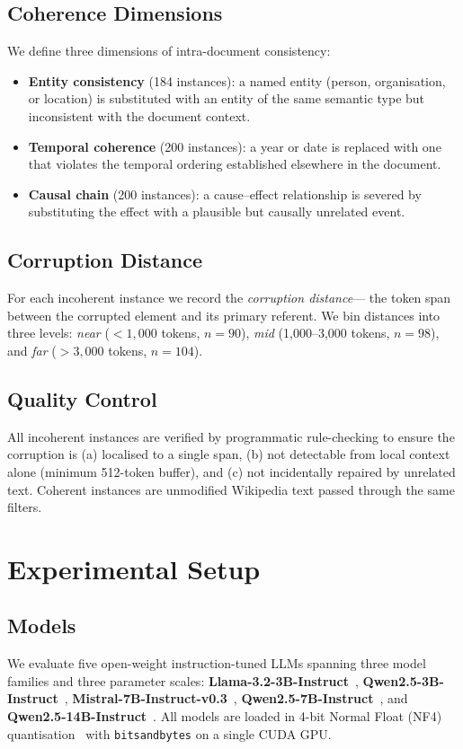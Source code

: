 \documentclass[conference]{IEEEtran}
\begin{document}
\subsection{Coherence Dimensions}
We define three dimensions of intra-document consistency:
\begin{itemize}
    \item \textbf{Entity consistency} (184 instances):
          a named entity (person, organisation, or location) is substituted
          with an entity of the same semantic type but inconsistent with the document context.
    \item \textbf{Temporal coherence} (200 instances):
          a year or date is replaced with one that violates the temporal ordering
          established elsewhere in the document.
    \item \textbf{Causal chain} (200 instances):
          a cause--effect relationship is severed by substituting the effect
          with a plausible but causally unrelated event.
\end{itemize}

\subsection{Corruption Distance}
For each incoherent instance we record the \emph{corruption distance}---
the token span between the corrupted element and its primary referent.
We bin distances into three levels:
\emph{near} ($< 1{,}000$ tokens, $n=90$),
\emph{mid} (1{,}000--3{,}000 tokens, $n=98$), and
\emph{far} ($> 3{,}000$ tokens, $n=104$).

\subsection{Quality Control}
All incoherent instances are verified by programmatic rule-checking to ensure
the corruption is (a) localised to a single span, (b) not detectable from
local context alone (minimum 512-token buffer), and
(c) not incidentally repaired by unrelated text.
Coherent instances are unmodified Wikipedia text passed through the same filters.

\section{Experimental Setup}
\subsection{Models}
We evaluate five open-weight instruction-tuned LLMs spanning three model families
and three parameter scales:
\textbf{Llama-3.2-3B-Instruct}~\cite{meta2024llama3},
\textbf{Qwen2.5-3B-Instruct}~\cite{qwen2024},
\textbf{Mistral-7B-Instruct-v0.3}~\cite{jiang2023mistral},
\textbf{Qwen2.5-7B-Instruct}~\cite{qwen2024}, and
\textbf{Qwen2.5-14B-Instruct}~\cite{qwen2024}.
All models are loaded in 4-bit Normal Float (NF4) quantisation~\cite{dettmers2023qlora}
with \texttt{bitsandbytes} on a single CUDA GPU.
\end{document}
